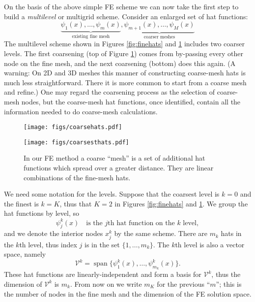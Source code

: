 \documentclass[letterpaper,final,12pt,reqno]{amsart}
\begin{document}
On the basis of the above simple FE scheme we can now take the first step to build a \emph{multilevel} or multigrid scheme.  Consider an enlarged set of hat functions:
    $$\underbrace{\psi_1(x),\dots,\psi_m(x)}_{\text{existing fine mesh}},\underbrace{\psi_{m+1}(x),\dots,\psi_M(x)}_{\text{coarser meshes}}$$
The multilevel scheme shown in Figures \ref{fig:finehats} and \ref{fig:coarsehats} includes two coarser levels.  The first coarsening (top of Figure \ref{fig:coarsehats}) comes from by-passing every other node on the fine mesh, and the next coarsening (bottom) does this again.  (A warning: On 2D and 3D meshes this manner of constructing coarse-mesh hats is much less straightforward.  There it is more common to start from a coarse mesh and refine.)  One may regard the coarsening process as the selection of coarse-mesh nodes, but the coarse-mesh hat functions, once identified, contain all the information needed to do coarse-mesh calculations.

\begin{figure}
\texttt{[image: figs/coarsehats.pdf]}
\smallskip

\texttt{[image: figs/coarsesthats.pdf]}
\caption{In our FE method a coarse ``mesh'' is a set of additional hat functions which spread over a greater distance.  They are linear combinations of the fine-mesh hats.}
\label{fig:coarsehats}
\end{figure}

We need some notation for the levels.  Suppose that the coarsest level is $k=0$ and the finest is $k=K$, thus that $K=2$ in Figures \ref{fig:finehats} and \ref{fig:coarsehats}.  We group the hat functions by level, so
\begin{equation}
  \psi_j^k(x) \quad \text{is the $j$th hat function on the $k$ level},  \label{definepsijk}
\end{equation}
and we denote the interior nodes $x_j^k$ by the same scheme.  There are $m_k$ hats in the $k$th level, thus index $j$ is in the set $\{1,\dots,m_k\}$.  The $k$th level is also a vector space, namely
\begin{equation}
  \mathcal{V}^k = \operatorname{span}\{\psi_1^k(x),\dots,\psi_{m_k}^k(x)\}.  \label{definevk}
\end{equation}
These hat functions are linearly-independent and form a basis for $\mathcal{V}^k$, thus the dimension of $\mathcal{V}^k$ is $m_k$.  From now on we write $m_K$ for the previous ``$m$''; this is the number of nodes in the fine mesh and the dimension of the FE solution space.
\end{document}
